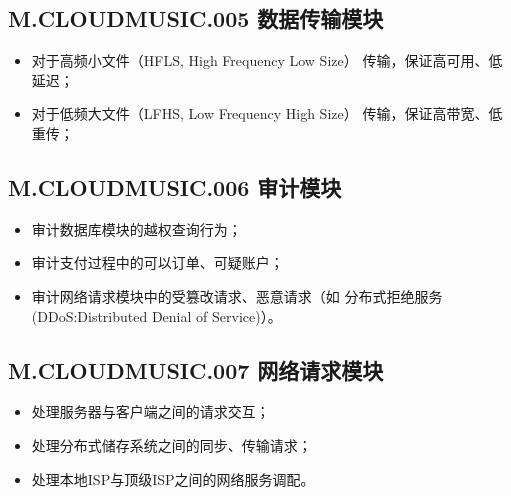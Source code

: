 \subsection{M.CLOUDMUSIC.005 数据传输模块}
\begin{itemize}
    \item 对于高频小文件（HFLS, High Frequency Low Size）
        传输，保证高可用、低延迟；
    \item 对于低频大文件（LFHS, Low Frequency High Size）
        传输，保证高带宽、低重传；
\end{itemize}

\subsection{M.CLOUDMUSIC.006 审计模块}
\begin{itemize}
    \item 审计数据库模块的越权查询行为；
    \item 审计支付过程中的可以订单、可疑账户；
    \item 审计网络请求模块中的受篡改请求、恶意请求（如
        分布式拒绝服务(DDoS:Distributed Denial of Service)）。
\end{itemize}

\subsection{M.CLOUDMUSIC.007 网络请求模块}
\begin{itemize}
    \item 处理服务器与客户端之间的请求交互；
    \item 处理分布式储存系统之间的同步、传输请求；
    \item 处理本地ISP与顶级ISP之间的网络服务调配。
\end{itemize}

\newpage

